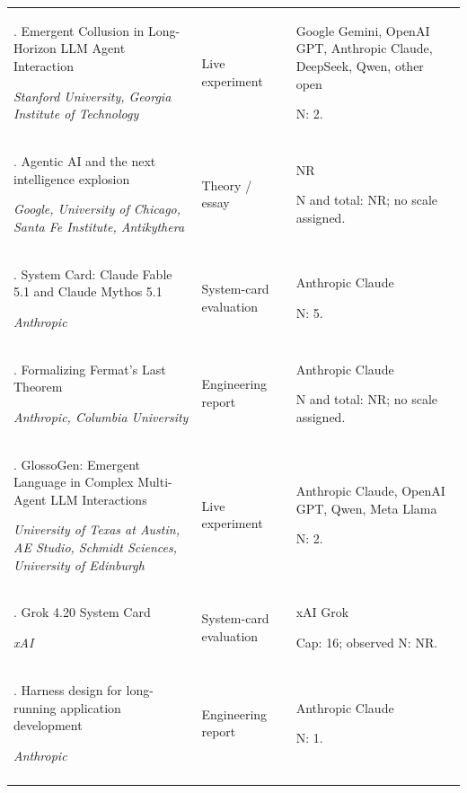 \begin{longtable}{@{}>{\raggedright\arraybackslash}p{}>{\raggedright\arraybackslash}p{}>{\raggedright\arraybackslash}p{}@{}}
78. Emergent Collusion in Long-Horizon LLM Agent Interaction \citep{emergent-collusion-long-horizon}\par\emph{Stanford University, Georgia Institute of Technology} & Live experiment & Google Gemini, OpenAI GPT, Anthropic Claude, DeepSeek, Qwen, other open\par N: 2. \\ \addlinespace[2pt]
79. Agentic AI and the next intelligence explosion \citep{evans-agentic-intelligence-explosion}\par\emph{Google, University of Chicago, Santa Fe Institute, Antikythera} & Theory / essay & NR\par N and total: NR; no scale assigned. \\ \addlinespace[2pt]
80. System Card: Claude Fable 5.1 and Claude Mythos 5.1 \citep{fable51-card-multiagent}\par\emph{Anthropic} & System-card evaluation & Anthropic Claude\par N: 5. \\ \addlinespace[2pt]
81. Formalizing Fermat's Last Theorem \citep{fermat-last-theorem}\par\emph{Anthropic, Columbia University} & Engineering report & Anthropic Claude\par N and total: NR; no scale assigned. \\ \addlinespace[2pt]
82. GlossoGen: Emergent Language in Complex Multi-Agent LLM Interactions \citep{glossogen-saveveyru}\par\emph{University of Texas at Austin, AE Studio, Schmidt Sciences, University of Edinburgh} & Live experiment & Anthropic Claude, OpenAI GPT, Qwen, Meta Llama\par N: 2. \\ \addlinespace[2pt]
83. Grok 4.20 System Card \citep{grok-420-multi-agent}\par\emph{xAI} & System-card evaluation & xAI Grok\par Cap: 16; observed N: NR. \\ \addlinespace[2pt]
84. Harness design for long-running application development \citep{harness-design-long-running}\par\emph{Anthropic} & Engineering report & Anthropic Claude\par N: 1. \\ \addlinespace[2pt]

\end{longtable}

